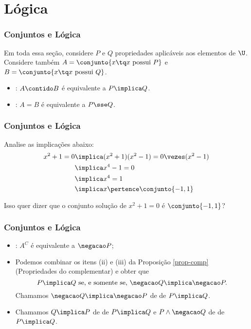 \section{Lógica}


\begin{frame}
	\frametitle{Conjuntos e Lógica}
	
	Em toda essa seção, considere $P$ e $Q$ propriedades aplicáveis aos elementos de $\U$. Considere também $A = \conjunto { x \tq x \text{ possui } P}$ e $B = \conjunto { x \tq x \text{ possui } Q}$.

	\begin{itemize}
		\item {}: $A \contido B$ é equivalente a
		$P \implica Q$.
		\item {}: $A=B$ é equivalente a $P
		\sse Q$.
	\end{itemize}
\end{frame}


\begin{frame}
	\frametitle{Conjuntos e Lógica} 

	\begin{exemplo}
		Analise as implicações abaixo:
		\begin{align*}
			x^2+1=0 & \implica (x^2+1)(x^2-1) = 0\vezes(x^2-1) \\
			        & \implica x^4-1 = 0 \\
			        & \implica x^4 = 1 \\
			        & \implica x \pertence \conjunto{-1, 1}
		\end{align*}

		Isso quer dizer que o conjunto solução de $x^2 +1 = 0$ é $\conjunto{-1, 1}$?
	\end{exemplo}
\end{frame}


\begin{frame}
	\frametitle{Conjuntos e Lógica} 

	\begin{itemize}
		\item {}: $A^C$ é equivalente a $\negacao P$;
		
		\item Podemos combinar os itens (ii) e (iii) da Proposição \ref{prop-comp} (Propriedades do complementar) e obter que
			$$P \implica Q \text{ se, e somente se, }\negacao Q \implica \negacao P.$$
		Chamamos $\negacao Q \implica \negacao P$ de  de $P \implica Q$.
		
		\item Chamamos $Q \implica P$ de  de $P \implica Q$ e $P \land \negacao Q$ de  de $P \implica Q$.
	\end{itemize}
\end{frame}


